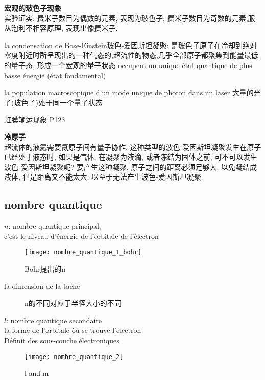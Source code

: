 \documentclass{article}
\begin{document}
\textbf{宏观的玻色子现象}\\
实验证实: 费米子数目为偶数的元素, 表现为玻色子; 费米子数目为奇数的元素,服从泡利不相容原理, 表现出像费米子.

la condensation de Bose-Einstein玻色-爱因斯坦凝聚: 是玻色子原子在冷却到绝对零度附近时所呈现出的一种气态的,超流性的物态,几乎全部原子都聚集到能量最低的量子态,
形成一个宏观的量子状态  occupent un unique \'etat quantique de plus basse \'energie (\'etat fondamental)

la population macroscopique d'un mode unique de photon dans un laser
大量的光子(玻色子)处于同一个量子状态

虹膜输运现象 P123

\textbf{冷原子}\\
超流体的液氦需要氦原子间有量子协作. 这种类型的波色-爱因斯坦凝聚发生在原子已经处于液态时, 如果是气体, 在凝聚为液滴, 或者冻结为固体之前,
可不可以发生波色-爱因斯坦凝聚呢? 要产生这种凝聚, 原子之间的距离必须足够大, 以免凝结成液体, 但是距离又不能太大, 以至于无法产生波色-爱因斯坦凝聚.

\subsection{nombre quantique}
$n$: nombre quantique principal, \\
c'est le niveau d'\'energie de l'orbitale de l'\'electron
\begin{figure}[!htbp]
		\centering
		\texttt{[image: nombre\_quantique\_1\_bohr]}
		\caption{Bohr提出的n}
		\label{fig.nombre_quantique.n}
\end{figure}

la dimension de la tache
\begin{figure}[h!]
    \centering
    \hspace{7em} %
    \hspace{7em} %
    \caption{n的不同对应于半径大小的不同}
    \label{fig-sub}
\end{figure}

$l$: nombre quantique secondaire\\
la forme de l'orbitale \`ou se trouve l'\'electron\\
Définit des sous-couche électroniques
\begin{figure}[!htbp]
		\centering
		\texttt{[image: nombre\_quantique\_2]}
		\caption{l and m}
		\label{fig.nombre_quantique.l_m}
\end{figure}
\end{document}
